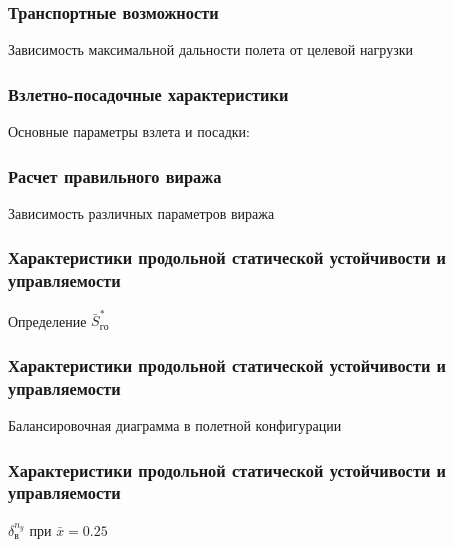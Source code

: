 \documentclass{beamer}
\begin{document}
\begin{frame}[t]
    \frametitle{Транспортные возможности}
    \begin{center}
        Зависимость максимальной дальности полета от целевой нагрузки

        \resizebox{.70\linewidth}{!}{}
    \end{center}
\end{frame}

\begin{frame}[t]
    \frametitle{Взлетно-посадочные характеристики}
    \vfill
    \begin{center}
        Основные параметры взлета и посадки:
        
    \end{center}
    \vfill
\end{frame}

\begin{frame}[t]
    \frametitle{Расчет правильного виража}
    \begin{center}
        Зависимость различных параметров виража
        \resizebox{.70\linewidth}{!}{}
    \end{center}
\end{frame}

\begin{frame}[t]
    \frametitle{Характеристики продольной статической устойчивости и управляемости}
   \begin{center}
       Определение $\bar{S}_{го}^*$ 

       \resizebox{.70\linewidth}{!}{}
   \end{center} 
\end{frame}

\begin{frame}[t]
    \frametitle{Характеристики продольной статической устойчивости и управляемости}
    \begin{center}
        Балансировочная диаграмма в полетной конфигурации 
        \resizebox{.70\linewidth}{!}{}
    \end{center}
\end{frame}

\begin{frame}[t]
    \frametitle{Характеристики продольной статической устойчивости и управляемости}
    \begin{center}
        $\delta_{в}^{n_y}$ при $\bar{x} = 0.25$

        \resizebox{0.70\textwidth}{!}{}
    \end{center}
\end{frame}
\end{document}
